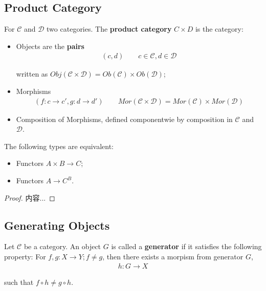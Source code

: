 \documentclass[Total.tex]{subfiles}
\begin{document}
			\subsection{Product Category}
				
				\begin{Def}
					For $\mathcal{C}$ and $\mathcal{D}$ two categories. The \textbf{product category} $C\times D$ is the category:
					\begin{itemize}
						\item Objects are the \textbf{pairs}
						\begin{gather*}
							(c,d)\qquad c\in \mathcal{C},d\in \mathcal{D}
						\end{gather*}
						
						written as $Obj(\mathcal{C}\times \mathcal{D})=Ob(\mathcal{C})\times Ob(\mathcal{D})$;
						\item Morphisms
						\begin{gather*}
							(f:c\rightarrow c',g:d\rightarrow d')\qquad Mor(\mathcal{C}\times \mathcal{D})=Mor(\mathcal{C})\times Mor(\mathcal{D})
						\end{gather*}
						\item Composition of Morphisms, defined componentwie by composition in $\mathcal{C}$ and $\mathcal{D}$.
					\end{itemize}
				\end{Def}
				
				\begin{lemma}
					The following types are equivalent:
					\begin{itemize}
						\item Functors $A\times B\rightarrow C$;
						\item Functors $A\rightarrow C^B$.
					\end{itemize}
				\end{lemma}
				\begin{proof}
					内容...
				\end{proof}
				
				\subsection{Generating Objects}
					\begin{Def}
						Let $\mathcal{C}$ be a category. An object $G$ is called a \textbf{generator} if it satisfies the following property: For $f,g:X\rightarrow Y;f\not= g$, then there exists a morpism from generator $G$,
						\begin{gather*}
							h:G\rightarrow X
						\end{gather*}			
						
						such that $f\circ h\not= g\circ h$.
					\end{Def}
					
\end{document}

